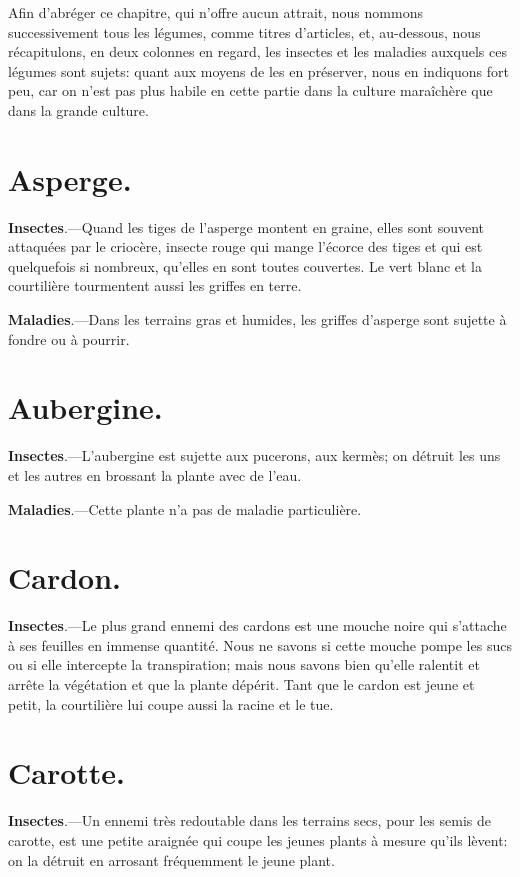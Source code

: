 \documentclass[10pt,a4paper]{book}
\begin{document}
Afin d'abréger ce chapitre, qui n'offre aucun attrait, nous nommons successivement tous les légumes, comme titres d'articles, et, au-dessous, nous récapitulons, en deux colonnes en regard, les insectes et les maladies auxquels ces légumes sont sujets: quant aux moyens de les en préserver, nous en indiquons fort peu, car on n'est pas plus habile en cette partie dans la culture maraîchère que dans la grande culture.

\section{Asperge.}

\textbf{Insectes}.---Quand les tiges de l'asperge montent en graine, elles sont souvent attaquées par le criocère, insecte rouge qui mange l'écorce des tiges et qui est quelquefois si nombreux, qu'elles en sont toutes couvertes. Le vert blanc et la courtilière tourmentent aussi les griffes en terre.

\textbf{Maladies}.---Dans les terrains gras et humides, les griffes d'asperge sont sujette à fondre ou à pourrir.

\section{Aubergine.}

\textbf{Insectes}.---L'aubergine est sujette aux pucerons, aux kermès; on détruit les uns et les autres en brossant la plante avec de l'eau.

\textbf{Maladies}.---Cette plante n'a pas de maladie particulière.

\section{Cardon.}

\textbf{Insectes}.---Le plus grand ennemi des cardons est une mouche noire qui s'attache à ses feuilles en immense quantité. Nous ne savons si cette mouche pompe les sucs ou si elle intercepte la transpiration; mais nous savons bien qu'elle ralentit et arrête la végétation et que la plante dépérit. Tant que le cardon est jeune et petit, la courtilière lui coupe aussi la racine et le tue.

\section{Carotte.}

\textbf{Insectes}.---Un ennemi très redoutable dans les terrains secs, pour les semis de carotte, est une petite araignée qui coupe les jeunes plants à mesure qu'ils lèvent: on la détruit en arrosant fréquemment le jeune plant.
\end{document}
